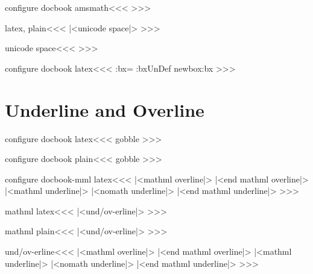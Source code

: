 \<configure docbook amsmath\><<<
\def\:temp{{\protect\AmSfont AMS}}
\HLet\AmS\:temp
>>>


\<latex, plain\><<<
|<unicode space|>
>>>

\<unicode space\><<<
\def\:nbsp{\HCode{\string&}\HChar{-35}\HCode{x00A0;}}%
>>>


\<configure docbook latex\><<<
    {\bgroup\let\@makefnmark\empty}
    {\egroup}%
    {}
   {\setbox\tmp:bx=\hbox\bgroup}
   {\egroup}
\ifx \tmp:bx\:UnDef \csname newbox\endcsname \tmp:bx \fi 
>>>





\section{Underline and Overline}



\<configure docbook latex\><<<
   {\:gobble}
   {}
   {}
   {}
>>>

\<configure docbook plain\><<<
   {\hbox\bgroup \:gobble}
   {\egroup {}}
   {}
   {}
>>>







\<configure docbook-mml latex\><<<
   {\bgroup\ifmathml |<mathml overline|>\else
         \fi}
   {\ifmathml |<end mathml overline|>\else {}\fi\egroup}
   {\bgroup
    \ifmathml |<mathml underline|>%
    \else |<nomath underline|>\fi}
   {\ifmathml |<end mathml underline|>\else {}\fi \egroup}
>>>


\<mathml latex\><<<
|<und/ov-erline|>
>>>

\<mathml plain\><<<
|<und/ov-erline|>
>>>


\<und/ov-erline\><<<
   {\bgroup |<mathml overline|>}
   {|<end mathml overline|>\egroup}
   {\bgroup \ifmmode |<mathml underline|>\else 
     |<nomath underline|>\fi}
   {|<end mathml underline|>\egroup}
>>>

